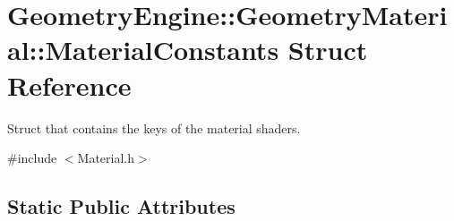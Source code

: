 \hypertarget{struct_geometry_engine_1_1_geometry_material_1_1_material_constants}{}\section{Geometry\+Engine\+::Geometry\+Material\+::Material\+Constants Struct Reference}
\label{struct_geometry_engine_1_1_geometry_material_1_1_material_constants}


Struct that contains the keys of the material shaders.  




{\ttfamily \#include $<$Material.\+h$>$}

\subsection*{Static Public Attributes}
